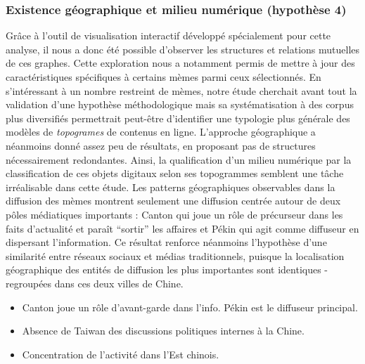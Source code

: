 \subsubsection{Existence géographique et milieu numérique (hypothèse 4)}
 
Gr\^ace à l{\textquoteright}outil de visualisation interactif développé spécialement pour cette analyse, il nous a donc été possible d{\textquoteright}observer les structures et relations mutuelles de ces graphes. Cette exploration nous a notamment permis de mettre à jour des caractéristiques spécifiques à certains mèmes parmi ceux sélectionnés. En s{\textquoteright}intéressant à un nombre restreint de mèmes, notre étude cherchait avant tout la validation d{\textquoteright}une hypothèse méthodologique mais sa systématisation à des corpus plus diversifiés permettrait peut-\^etre d{\textquoteright}identifier une typologie plus générale des modèles de \textit{topogrames} de contenus en ligne. L{\textquoteright}approche géographique a néanmoins donné assez peu de résultats, en proposant pas de structures nécessairement redondantes. Ainsi, la qualification d{\textquoteright}un milieu numérique par la classification de ces objets digitaux selon ses topogrammes semblent une t\^ache irréalisable dans cette étude. Les patterns géographiques observables dans la diffusion des mèmes montrent seulement une diffusion centrée autour de deux p\^oles médiatiques importants : Canton qui joue un r\^ole de précurseur dans les faits d{\textquoteright}actualité et para\^it {\textquotedblleft}sortir{\textquotedblright} les affaires et Pékin qui agit comme diffuseur en dispersant l{\textquoteright}information. Ce résultat renforce néanmoins l{\textquoteright}hypothèse d{\textquoteright}une similarité entre réseaux sociaux et médias traditionnels, puisque la localisation géographique des entités de diffusion les plus importantes sont identiques - regroupées dans ces deux villes de Chine.

\begin{itemize}
    \item Canton joue un rôle d'avant-garde dans l'info. Pékin est le diffuseur principal.
    \item Absence de Taiwan des discussions politiques internes à la Chine.
    \item Concentration de l'activité dans l'Est chinois.
\end{itemize}


